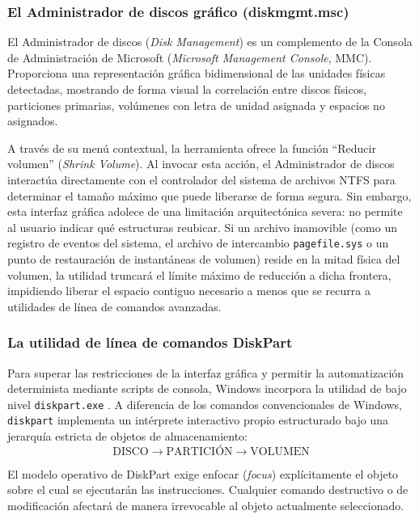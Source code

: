 \documentclass[12pt]{article}
\begin{document}
\subsubsection{El Administrador de discos gráfico (diskmgmt.msc)}

El Administrador de discos (\textit{Disk Management}) es un complemento de la Consola de Administración de Microsoft (\textit{Microsoft Management Console}, MMC). Proporciona una representación gráfica bidimensional de las unidades físicas detectadas, mostrando de forma visual la correlación entre discos físicos, particiones primarias, volúmenes con letra de unidad asignada y espacios no asignados.

A través de su menú contextual, la herramienta ofrece la función \enquote{Reducir volumen} (\textit{Shrink Volume}). Al invocar esta acción, el Administrador de discos interactúa directamente con el controlador del sistema de archivos NTFS para determinar el tamaño máximo que puede liberarse de forma segura. Sin embargo, esta interfaz gráfica adolece de una limitación arquitectónica severa: no permite al usuario indicar qué estructuras reubicar. Si un archivo inamovible (como un registro de eventos del sistema, el archivo de intercambio \texttt{pagefile.sys} o un punto de restauración de instantáneas de volumen) reside en la mitad física del volumen, la utilidad truncará el límite máximo de reducción a dicha frontera, impidiendo liberar el espacio contiguo necesario a menos que se recurra a utilidades de línea de comandos avanzadas.

\subsubsection{La utilidad de línea de comandos DiskPart}

Para superar las restricciones de la interfaz gráfica y permitir la automatización determinista mediante scripts de consola, Windows incorpora la utilidad de bajo nivel \texttt{diskpart.exe} \parencite{microsoft2024diskpart}. A diferencia de los comandos convencionales de Windows, \texttt{diskpart} implementa un intérprete interactivo propio estructurado bajo una jerarquía estricta de objetos de almacenamiento:
\begin{equation}
    \text{DISCO} \longrightarrow \text{PARTICIÓN} \longrightarrow \text{VOLUMEN}
\end{equation}

El modelo operativo de DiskPart exige enfocar (\textit{focus}) explícitamente el objeto sobre el cual se ejecutarán las instrucciones. Cualquier comando destructivo o de modificación afectará de manera irrevocable al objeto actualmente seleccionado. 
\end{document}
